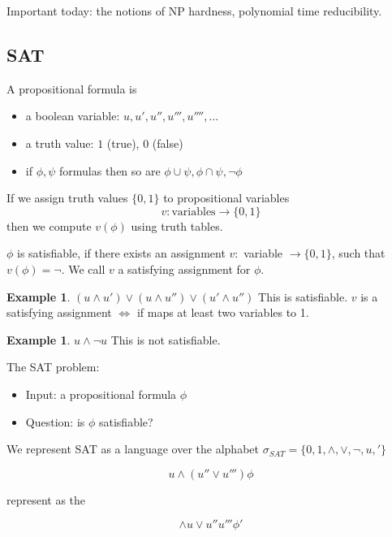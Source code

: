 \documentclass[a4paper,12pt]{article}
\theoremstyle{definition}
\newtheorem{example}[counter]{Example}
\theoremstyle{remark}
\begin{document}
Important today: the notions of NP hardness, polynomial time reducibility.

\subsection{SAT}

A propositional formula is
\begin{itemize}
    \item a boolean variable: $u, u', u'', u''', u'''', ...$
    \item a truth value: $1$ (true), $0$ (false)
    \item if $\phi, \psi$ formulas then so are $\phi \cup \psi, \phi \cap \psi, \neg \phi$
\end{itemize}

If we assign truth values $\{0, 1\}$ to propositional variables
\begin{equation*}
    v: \text{variables} \to \{0, 1\}
\end{equation*}
then we compute $v(\phi)$ using truth tables.

$\phi$ is satisfiable, if there exists an assignment $v:$ variable $\to \{0, 1\}$, such that $v(\phi) = \neg$.
We call $v$ a satisfying assignment for $\phi$.

\begin{example}
    $(u \land u') \lor (u \land u'') \lor (u' \land u'')$
    This is satisfiable. $v$ is a satisfying assignment $\iff$ if maps at least two variables to 1.
\end{example}

\begin{example}
    $u \land \neg u$
    This is not satisfiable.
\end{example}

The SAT problem:
\begin{itemize}
    \item Input: a propositional formula $\phi$
    \item Question: is $\phi$ satisfiable?
\end{itemize}

We represent SAT as a language over the alphabet $\sigma_{SAT} = \{0, 1, \land, \lor, \neg, u, '\}$

\begin{equation*}
    u \land (u'' \lor u''') \phi
\end{equation*}

represent as the

\begin{equation*}
    \land u \lor u'' u''' \phi'
\end{equation*}
\end{document}
